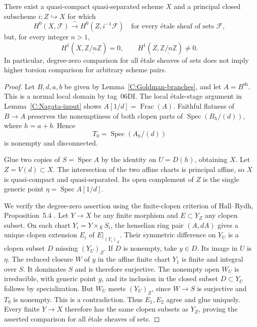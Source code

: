 \begin{theorem}\label{C:subject21-torsion-counterexample}
There exist a quasi-compact quasi-separated scheme $X$ and a
principal closed subscheme $i:Z\hookrightarrow X$ for which
\[
 H^0(X,\mathcal F)\xrightarrow{\ \sim\ }
 H^0(Z,i^{-1}\mathcal F)
 \quad\text{for every \'etale sheaf of sets }\mathcal F,
\]
but, for every integer $n>1$,
\[
 H^1(X,\underline{\mathbb Z/n\mathbb Z})=0,
 \qquad H^1(Z,\underline{\mathbb Z/n\mathbb Z})\ne0.
\]
In particular, degree-zero comparison for all \'etale sheaves of
sets does not imply higher torsion comparison for arbitrary
scheme pairs.
\end{theorem}
\begin{proof}
Let $B,d,a,b$ be given by Lemma~\ref{C:Goldman-branches}, and let
$A=B^{\mathrm{sh}}$. This is a normal local domain by tag~06DI.
The local \'etale-stage argument in Lemma~\ref{C:Nagata-input}
shows $A[1/d]=\operatorname{Frac}(A)$. Faithful flatness of
$B\to A$ preserves the nonemptiness of both clopen parts of
$\operatorname{Spec}(B_h/(d))$, where $h=a+b$. Hence
\[
 T_0=\operatorname{Spec}(A_h/(d))
\]
is nonempty and disconnected.

Glue two copies of $S=\operatorname{Spec}A$ by the identity on
$U=D(h)$, obtaining $X$. Let $Z=V(d)\subset X$. The intersection
of the two affine charts is principal affine, so $X$ is
quasi-compact and quasi-separated. Its open complement of $Z$
is the single generic point $\eta=\operatorname{Spec}A[1/d]$.

We verify the degree-zero assertion using the finite-clopen
criterion of Hall--Rydh, Proposition~5.4 \cite{BHallRydh2023}.
Let $Y\to X$ be any
finite morphism and $E\subset Y_Z$ any clopen subset. On each
chart $Y_i=Y\times_XS_i$, the henselian ring pair $(A,dA)$ gives
a unique clopen extension $E_i$ of $E|_{(Y_i)_Z}$. Their symmetric
difference on $Y_U$ is a clopen subset $D$ missing $(Y_U)_Z$.
If $D$ is nonempty, take $y\in D$. Its image in $U$ is $\eta$.
The reduced closure $W$ of $y$ in the affine finite chart $Y_1$
is finite and integral over $S$. It dominates $S$ and is
therefore surjective. The nonempty open $W_U$ is irreducible,
with generic point $y$, and its inclusion in the closed subset
$D\subset Y_U$ follows by specialization. But $W_U$ meets
$(Y_U)_Z$, since $W\to S$ is surjective and $T_0$ is nonempty.
This is a contradiction. Thus $E_1,E_2$ agree and glue uniquely.
Every finite $Y\to X$ therefore has the same clopen subsets as
$Y_Z$, proving the asserted comparison for all \'etale sheaves
of sets.


\end{proof}
